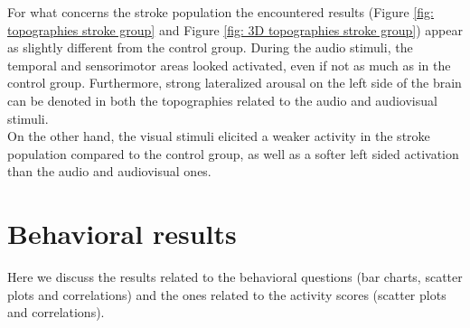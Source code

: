 For what concerns the stroke population the encountered results (Figure \ref{fig: topographies stroke group} and Figure \ref{fig: 3D topographies stroke group}) appear as slightly different from the control group. During the audio stimuli, the temporal and sensorimotor areas looked activated, even if not as much as in the control group. Furthermore, strong lateralized arousal on the left side of the brain can be denoted in both the topographies related to the audio and audiovisual stimuli. \\
On the other hand, the visual stimuli elicited a weaker activity in the stroke population compared to the control group, as well as a softer left sided activation than the audio and audiovisual ones. 




\section{Behavioral results}
Here we discuss the results related to the behavioral questions (bar charts, scatter plots and correlations) and the ones related to the activity scores (scatter plots and correlations).